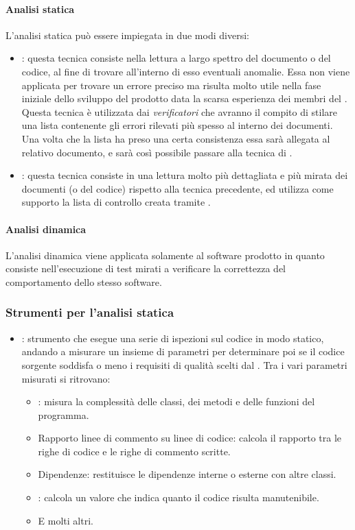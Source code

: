 \paragraph{Analisi statica}
L'analisi statica può essere impiegata in due modi diversi:
\begin{itemize}
  \item \textbf{}: questa tecnica  consiste nella
  lettura a largo spettro del documento o del codice, al fine di trovare all'interno di esso eventuali anomalie. Essa non viene applicata per trovare un errore preciso ma risulta
  molto utile nella fase iniziale dello sviluppo del prodotto data la scarsa
  esperienza dei membri del . Questa tecnica è utilizzata dai \textit{verificatori}
  che avranno il compito di stilare una lista contenente gli errori rilevati più
  spesso al interno dei documenti. Una volta che la lista ha preso una certa consistenza essa sarà allegata al relativo documento, e sarà così possibile passare alla tecnica di .
  \item \textbf{}: questa tecnica consiste in una
  lettura molto più dettagliata e più mirata dei documenti (o del codice) rispetto alla tecnica precedente, ed utilizza come supporto la lista di controllo creata tramite .
\end{itemize}

\paragraph{Analisi dinamica}
L'analisi dinamica viene applicata solamente al software prodotto in quanto consiste nell'esecuzione di test mirati a verificare la correttezza del comportamento dello stesso software.


\subsubsection{Strumenti per l'analisi statica}
\begin{itemize}
  \item \textbf{}: strumento che esegue una serie di ispezioni sul codice in modo statico, andando a misurare un insieme di parametri per determinare poi se il codice sorgente soddisfa o meno i requisiti di qualità scelti dal . Tra i vari parametri misurati si ritrovano:
  \begin{itemize}
    \item \textbf{}: misura la complessità delle classi, dei metodi e delle funzioni del programma.
    \item Rapporto linee di commento su linee di codice: calcola il rapporto tra
    le righe di codice e le righe di commento scritte.
    \item Dipendenze: restituisce le dipendenze interne o esterne con altre
    classi.
    \item \textbf{}: calcola un valore che indica quanto il
    codice risulta manutenibile.
    \item E molti altri.
  \end{itemize}
\end{itemize}

